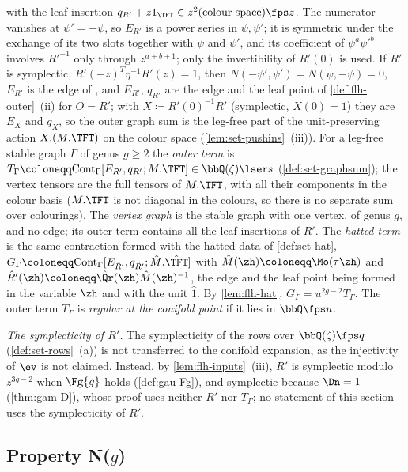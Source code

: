 \begin{defn}
with the leaf insertion $q_{R'}+z1_{\TFT}\in z^2(\text{colour space})\fps z$. The numerator vanishes at $\psi'=-\psi$, so $E_{R'}$ is a power series in $\psi,\psi'$; it is symmetric under the exchange of its two slots together with $\psi$ and $\psi'$, and its coefficient of $\psi^a\psi'^b$ involves $R'^{-1}$ only through $z^{a+b+1}$; only the invertibility of $R'(0)$ is used. If $R'$ is symplectic, $R'(-z)^T\eta^{-1}R'(z)=1$, then $N(-\psi',\psi')=N(\psi,-\psi)=0$, $E_{R'}$ is the edge of \cite[Def.~2.2]{PPZ15} \cite[Rem.~2.1, (6)]{PPZ15}, and $E_{R'}$, $q_{R'}$ are the edge and the leaf point of \cref{def:flh-outer}~(ii) for $O=R'$; with $X\coloneqq R'(0)^{-1}R'$ (symplectic, $X(0)=1$) they are $E_X$ and $q_X$, so the outer graph sum is the leg-free part of the unit-preserving action $X.(M.\TFT)$ on the colour space (\cref{lem:set-pushins}~(iii)). For a leg-free stable graph $\Gamma$ of genus $g\geq2$ the \emph{outer term} is $T_\Gamma\coloneqq\mathrm{Cont}_\Gamma[E_{R'},q_{R'};M.\TFT]\in\bbQ(\zeta)\lser s$ (\cref{def:set-graphsum}); the vertex tensors are the full tensors of $M.\TFT$, with all their components in the colour basis ($M.\TFT$ is not diagonal in the colours, so there is no separate sum over colourings). The \emph{vertex graph} is the stable graph with one vertex, of genus $g$, and no edge; its outer term contains all the leaf insertions of $R'$. The \emph{hatted term} is the same contraction formed with the hatted data of \cref{def:set-hat}, $G_\Gamma\coloneqq\mathrm{Cont}_\Gamma[E_{\hat R'},q_{\hat R'};\hat M.\hat\TFT]$ with $\hat M(\zh)\coloneqq\Mo(\tau\zh)$ and $\hat R'(\zh)\coloneqq\hat\Qr(\zh)\hat M(\zh)^{-1}$, the edge and the leaf point being formed in the variable $\zh$ and with the unit $\hat1$. By \cref{lem:flh-hat}, $G_\Gamma=u^{2g-2}T_\Gamma$. The outer term $T_\Gamma$ is \emph{regular at the conifold point} if it lies in $\bbQ\fps u$.

\emph{The symplecticity of $R'$.} The symplecticity of the rows over $\bbQ(\zeta)\fps q$ (\cref{def:set-rows}~(a)) is not transferred to the conifold expansion, as the injectivity of $\ev$ is not claimed. Instead, by \cref{lem:flh-inputs}~(iii), $R'$ is symplectic modulo $z^{3g-2}$ when $\Fg{g}$ holds (\cref{def:gau-Fg}), and symplectic because $\Dn=1$ (\cref{thm:gam-D}), whose proof uses neither $R'$ nor $T_\Gamma$; no statement of this section uses the symplecticity of $R'$.
\end{defn}

\subsection{Property N(\texorpdfstring{$g$}{g})}
\label{sec:set-N}

